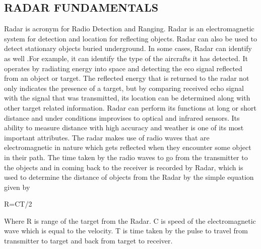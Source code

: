 \documentclass[14pt]{article} %
\begin{document}
\subsection{RADAR FUNDAMENTALS}
Radar is acronym for Radio Detection and Ranging. Radar is an electromagnetic system for detection and location for reflecting objects. Radar can also be used to detect stationary objects buried underground. In some cases, Radar can identify as well .For example, it can identify the type of the aircrafts it has detected. It operates by radiating energy into space and detecting the eco signal reflected from an object or target. The reflected energy that is returned to the radar not only indicates the presence of a target, but by comparing received echo signal with the signal that was transmitted, its location can be determined along with other target related information. Radar can perform its functions at long or short distance and  under conditions improvises to optical and infrared sensors. Its ability to measure distance with high accuracy and weather is one of its most important attributes. The radar makes use of radio waves that are electromagnetic in nature which gets reflected when they encounter some object in their path. 
The time taken by the radio waves to go from the transmitter to the objects and in coming back to the receiver is recorded by Radar, which is used to determine the distance of objects from the Radar by the simple equation given by
 \begin{center}                                             
    R=CT/2
 \end{center}
Where R is range of the target from the Radar.
 C is speed of the electromagnetic wave which is equal to the velocity.
 T is time taken by the pulse to travel from transmitter to target and back from target to receiver.
\end{document}
